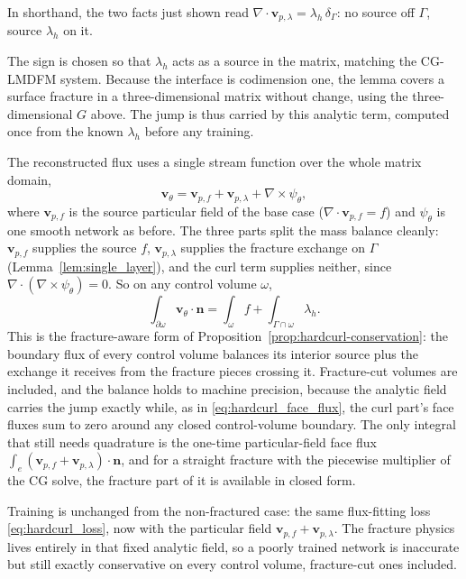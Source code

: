 \documentclass[a4paper,fleqn]{cas-sc}
\newcommand{\vflux}{\mathbf{v}}
\newcommand{\curl}{\nabla\times}          %
\begin{document}
\smallskip\noindent
In shorthand, the two facts just shown read
\(\nabla\cdot\vflux_{p,\lambda}=\lambda_h\,\delta_\Gamma\): no source off
\(\Gamma\), source \(\lambda_h\) on it.

The sign is chosen so that \(\lambda_h\) acts as a source in the matrix, matching
the CG-LMDFM system. Because the interface is codimension one, the lemma covers a
surface fracture in a three-dimensional matrix without change, using the
three-dimensional \(G\) above. The jump is thus carried by this analytic term,
computed once from the known \(\lambda_h\) before any training.

The reconstructed flux uses a single stream function over the whole matrix
domain,
\begin{equation}
  \vflux_\theta
  =
  \vflux_{p,f} + \vflux_{p,\lambda} + \curl\psi_\theta ,
  \label{eq:hardcurl_fractured_flux}
\end{equation}
where \(\vflux_{p,f}\) is the source particular field of the base case
(\(\nabla\cdot\vflux_{p,f}=f\)) and \(\psi_\theta\) is one smooth network as
before. The three parts split the mass balance cleanly: \(\vflux_{p,f}\) supplies
the source \(f\), \(\vflux_{p,\lambda}\) supplies the fracture exchange on
\(\Gamma\) (Lemma~\ref{lem:single_layer}), and the curl term supplies neither,
since \(\nabla\cdot(\curl\psi_\theta)=0\). So on any control volume \(\omega\),
\begin{equation}
  \int_{\partial\omega}\vflux_\theta\cdot\mathbf{n}
  =
  \int_\omega f
  +
  \int_{\Gamma\cap\omega}\lambda_h .
  \label{eq:hardcurl_fracture_balance}
\end{equation}
This is the fracture-aware form of
Proposition~\ref{prop:hardcurl-conservation}: the boundary flux of every control
volume balances its interior source plus the exchange it receives from the
fracture pieces crossing it. Fracture-cut volumes are included, and the balance
holds to machine precision, because the analytic field carries the jump exactly
while, as in \eqref{eq:hardcurl_face_flux}, the curl part's face fluxes sum to
zero around any closed control-volume boundary. The only integral that still needs
quadrature is the one-time particular-field face flux
\(\int_e(\vflux_{p,f}+\vflux_{p,\lambda})\cdot\mathbf{n}\), and for a straight
fracture with the piecewise multiplier of the CG solve, the fracture part of it is
available in closed form.

Training is unchanged from the non-fractured case: the same flux-fitting loss
\eqref{eq:hardcurl_loss}, now with the particular field
\(\vflux_{p,f}+\vflux_{p,\lambda}\). The fracture physics lives entirely in that
fixed analytic field, so a poorly trained network is inaccurate but still exactly
conservative on every control volume, fracture-cut ones included.
\end{document}
